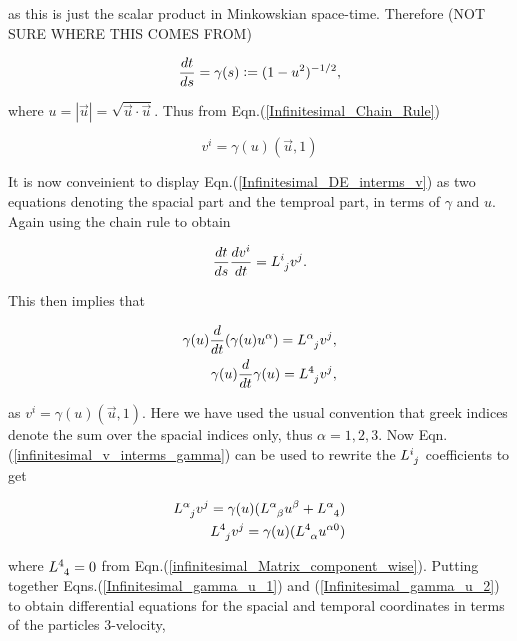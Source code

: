 \noindent as this is just the scalar product in Minkowskian space-time. Therefore (NOT SURE WHERE THIS COMES FROM)

\begin{equation*}
\frac{dt}{ds} = \gamma (s) \vcentcolon = (1-u^2)^{-1/2},
\end{equation*}

\noindent where $u = |\vec{u}| = \sqrt{\vec{u} \cdot \vec{u}}$. Thus from Eqn.(\ref{Infinitesimal_Chain_Rule})

\begin{equation}\label{infinitesimal_v_interms_gamma}
v^i = \gamma(u) (\vec{u}, 1)
\end{equation}

\noindent It is now conveinient to display Eqn.(\ref{Infinitesimal_DE_interms_v}) as two equations denoting the spacial part and the temproal part, in terms of $\gamma$ and $u$. Again using the chain rule to obtain

\begin{equation*} 
\frac{dt}{ds} \frac{dv^i}{dt} = \tensor{L}{^{i}_{j}}v^j. 
\end{equation*} 

\noindent This then implies that 

\begin{eqnarray}\label{Infinitesimal_gamma_u_1}
\gamma(u) \frac{d}{dt} (\gamma(u) u^{\alpha}) = \tensor{L}{^{\alpha}_{j}} v^j, \\\nonumber
\gamma(u) \frac{d}{dt} \gamma(u) = \tensor{L}{^{4}_{j}} v^j,
\end{eqnarray}

\noindent as $v^i = \gamma(u)(\vec{u},1)$. Here we have used the usual convention that greek indices denote the sum over the spacial indices only, thus $\alpha = 1,2,3$. Now Eqn.(\ref{infinitesimal_v_interms_gamma}) can be used to rewrite the $\tensor{L}{^{i}_{j}}$ coefficients to get

\begin{eqnarray}\label{Infinitesimal_gamma_u_2}
\tensor{L}{^{\alpha}_{j}} v^j = \gamma(u) (\tensor{L}{^{\alpha}_{\beta}} u^{\beta} + \tensor{L}{^{\alpha}_4}) \\ \nonumber
\tensor{L}{^{4}_{j}} v^j = \gamma(u) (\tensor{L}{^{4}_{\alpha}} u^{\alpha0})
\end{eqnarray} 

\noindent where $\tensor{L}{^{4}_{4}} = 0$ from Eqn.(\ref{infinitesimal_Matrix_component_wise}). Putting together Eqns.(\ref{Infinitesimal_gamma_u_1}) and (\ref{Infinitesimal_gamma_u_2}) to obtain differential equations for the spacial and temporal coordinates in terms of the particles $3$-velocity,

